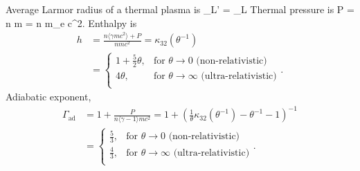 \documentclass{aa}
\begin{document}
Average Larmor radius of a thermal plasma is
\be
\lambda_L' = \lambda_L 
\ee
Thermal pressure is
\be
P =  n \langle {} \cdot \gamma m  \rangle = n \theta m_e c^2.
\ee
Enthalpy is
\begin{align}
    h &= \frac{n \langle \gamma m c^2 \rangle + P }{n m c^2} = \kappa_{32}(\theta^{-1}) \\
    &= 
\begin{cases}
    1 + \frac{5}{2} \theta, & \text{for } \theta \rightarrow 0      \text{ (non-relativistic)}\\
    4 \theta,               & \text{for } \theta \rightarrow \infty \text{ (ultra-relativistic)}\\
\end{cases}.
\end{align}
Adiabatic exponent,
\begin{align}
    \Gamma_{\mathrm{ad}} &= 1 + \frac{P}{n \langle \gamma - 1 \rangle m c^2} 
    = 1 + \left( \frac{1}{\theta} \kappa_{32}(\theta^{-1}) - \theta^{-1} - 1 \right)^{-1} \\
    &= 
\begin{cases}
    \frac{5}{3}, & \text{for } \theta \rightarrow 0      \text{ (non-relativistic)}\\
    \frac{4}{3},               & \text{for } \theta \rightarrow \infty \text{ (ultra-relativistic)}\\
\end{cases}.
\end{align}
\end{document}
